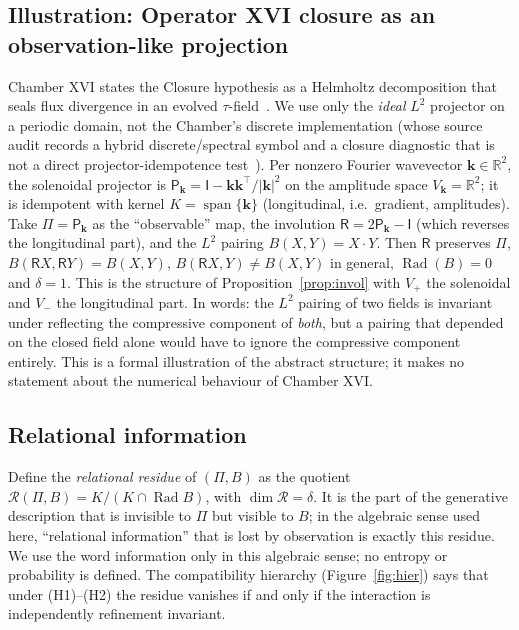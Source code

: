 \documentclass[11pt,a4paper]{article}
\newcommand{\RR}{\mathbb{R}}
\newcommand{\Rad}{\operatorname{Rad}}
\newcommand{\spn}{\operatorname{span}}
\newcommand{\defic}{\delta}
\theoremstyle{plain}
\theoremstyle{definition}
\begin{document}
\subsection{Illustration: Operator XVI closure as an observation-like projection}\label{sec:closure}
Chamber XVI states the Closure hypothesis as a Helmholtz decomposition that seals flux divergence in an evolved $\tau$-field~\cite{G7}. We use only the \emph{ideal} $L^2$ projector on a periodic domain, not the Chamber's discrete implementation (whose source audit records a hybrid discrete/spectral symbol and a closure diagnostic that is not a direct projector-idempotence test~\cite{G5}).
Per nonzero Fourier wavevector $\mathbf k\in\RR^2$, the solenoidal projector is $\mathsf P_{\mathbf k}=\mathsf I-\mathbf k\mathbf k^{\!\top}/|\mathbf k|^2$ on the amplitude space $V_{\mathbf k}=\RR^2$; it is idempotent with kernel $K=\spn\{\mathbf k\}$ (longitudinal, i.e.\ gradient, amplitudes). Take $\Pi=\mathsf P_{\mathbf k}$ as the ``observable'' map, the involution $\mathsf R=2\mathsf P_{\mathbf k}-\mathsf I$ (which reverses the longitudinal part), and the $L^2$ pairing $B(X,Y)=X\cdot Y$. Then $\mathsf R$ preserves $\Pi$, $B(\mathsf RX,\mathsf RY)=B(X,Y)$, $B(\mathsf RX,Y)\ne B(X,Y)$ in general, $\Rad(B)=0$ and $\defic=1$.
This is the structure of Proposition~\ref{prop:invol} with $V_+$ the solenoidal and $V_-$ the longitudinal part. In words: the $L^2$ pairing of two fields is invariant under reflecting the compressive component of \emph{both}, but a pairing that depended on the closed field alone would have to ignore the compressive component entirely. This is a formal illustration of the abstract structure; it makes no statement about the numerical behaviour of Chamber XVI.


\subsection{Relational information}
Define the \emph{relational residue} of $(\Pi,B)$ as the quotient $\mathcal R(\Pi,B)=K/(K\cap\Rad B)$, with $\dim\mathcal R=\defic$. It is the part of the generative description that is invisible to $\Pi$ but visible to $B$; in the algebraic sense used here, ``relational information'' that is lost by observation is exactly this residue. We use the word information only in this algebraic sense; no entropy or probability is defined. The compatibility hierarchy (Figure~\ref{fig:hier}) says that under (H1)--(H2) the residue vanishes if and only if the interaction is independently refinement invariant.
\end{document}
